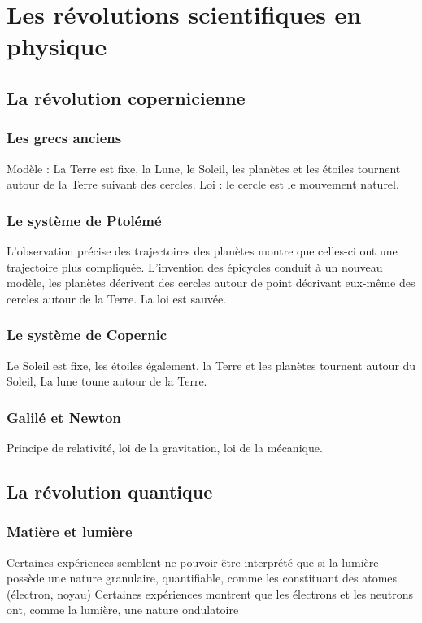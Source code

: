 \section{Les révolutions scientifiques en physique}

  \subsection{La révolution copernicienne}
    \subsubsection{Les grecs anciens}
Modèle : La Terre est fixe, la Lune, le Soleil, les planètes et les étoiles tournent autour de la Terre suivant des cercles.
Loi : le cercle est le mouvement naturel.
    \subsubsection{Le système de Ptolémé}
L'observation précise des trajectoires des planètes montre que celles-ci ont une trajectoire plus compliquée.
L'invention des épicycles conduit à un nouveau modèle, les planètes décrivent des cercles autour de point décrivant eux-même des cercles autour de la Terre. La loi est sauvée.
    \subsubsection{Le système de Copernic}
Le Soleil est fixe, les étoiles également, la Terre et les planètes tournent autour du Soleil, La lune toune autour de la Terre.
    \subsubsection{Galilé et Newton}
Principe de relativité, loi de la gravitation, loi de la mécanique.

  \subsection{La révolution quantique}
    \subsubsection{Matière et lumière}
Certaines expériences semblent ne pouvoir être interprété que si la lumière possède une nature granulaire, quantifiable, comme les constituant des atomes (électron, noyau)
Certaines expériences montrent que les électrons et les neutrons ont, comme la lumière, une nature ondulatoire

